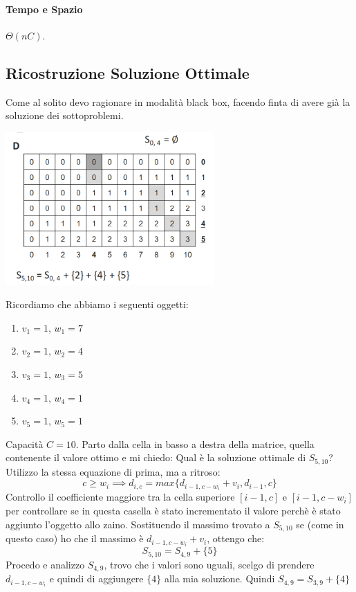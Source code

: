 \paragraph*{Tempo e Spazio} $\Theta(nC)$.
\subsection{Ricostruzione Soluzione Ottimale}
Come al solito devo ragionare in modalità black box, facendo finta di avere già la soluzione
dei sottoproblemi.
\begin{center}
    \includegraphics[width=80mm,scale=0.5]{chapters_ulerich/img/knapsack_ricostruzione_sol_ottima.png}
\end{center}
Ricordiamo che abbiamo i seguenti oggetti:
\begin{enumerate}
    \item $v_1 = 1,\, w_1 = 7$
    \item $v_2 = 1,\, w_2 = 4$
    \item $v_3 = 1,\, w_3 = 5$
    \item $v_4 = 1,\, w_4 = 1$
    \item $v_5 = 1,\, w_5 = 1$
\end{enumerate}
Capacità $C=10$.
Parto dalla cella in basso a destra della matrice, quella contenente il valore ottimo e mi
chiedo: Qual è la soluzione ottimale di $S_{5,10}$?\\
Utilizzo la stessa equazione di prima, ma a ritroso:
\[ c \geq w_i \implies d_{i,c} = max\{d_{i-1,c- w_i} + v_i, d_{i-1},c\}\]
Controllo il coefficiente maggiore tra la cella superiore $[i-1,c]$ e $[i-1,c-w_i]$ per
controllare se in questa casella è stato incrementato il valore perchè è stato aggiunto
l'oggetto allo zaino. Sostituendo il massimo trovato a $S_{5,10}$ se (come in questo caso)
ho che il massimo è $d_{i-1,c-w_i}+v_i$, ottengo che:
\[ S_{5,10}=S_{4,9} + \{5\} \]
Procedo e analizzo $S_{4,9}$, trovo che i valori sono uguali, scelgo di prendere $d_{i-1,c-w_i}$
e quindi di aggiungere $\{4\}$ alla mia soluzione. Quindi $S_{4,9}=S_{3,9}+\{4\}$
